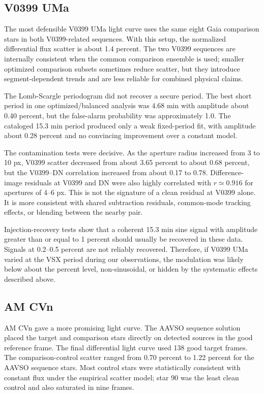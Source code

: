 \documentclass[11pt]{article}
\begin{document}
\subsection{V0399 UMa}

The most defensible V0399 UMa light curve uses the same eight Gaia comparison
stars in both V0399-related sequences. With this setup, the normalized
differential flux scatter is about 1.4 percent. The two V0399 sequences are
internally consistent when the common comparison ensemble is used; smaller
optimized comparison subsets sometimes reduce scatter, but they introduce
segment-dependent trends and are less reliable for combined physical claims.

The Lomb-Scargle periodogram did not recover a secure period. The best short
period in one optimized/balanced analysis was 4.68 min with amplitude about
0.40 percent, but the false-alarm probability was approximately 1.0. The
cataloged 15.3 min period produced only a weak fixed-period fit, with amplitude
about 0.28 percent and no convincing improvement over a constant model.

The contamination tests were decisive. As the aperture radius increased from
3 to 10 px, V0399 scatter decreased from about 3.65 percent to about
0.68 percent, but the V0399--DN correlation increased from about 0.17 to
0.78. Difference-image residuals at V0399 and DN were also highly correlated
with $r \simeq 0.916$ for apertures of 4--6 px. This is not the signature of a
clean residual at V0399 alone. It is more consistent with shared subtraction
residuals, common-mode tracking effects, or blending between the nearby pair.

Injection-recovery tests show that a coherent 15.3 min sine signal with
amplitude greater than or equal to 1 percent should usually be recovered in
these data. Signals at 0.2--0.5 percent are not reliably recovered. Therefore,
if V0399 UMa varied at the VSX period during our observations, the modulation
was likely below about the percent level, non-sinusoidal, or hidden by the
systematic effects described above.

\subsection{AM CVn}

AM CVn gave a more promising light curve. The AAVSO sequence solution placed
the target and comparison stars directly on detected sources in the good
reference frame. The final differential light curve used 138 good target frames.
The comparison-control scatter ranged from 0.70 percent to 1.22 percent for the
AAVSO sequence stars. Most control stars were statistically consistent with
constant flux under the empirical scatter model; star 90 was the least clean
control and also saturated in nine frames.
\end{document}
